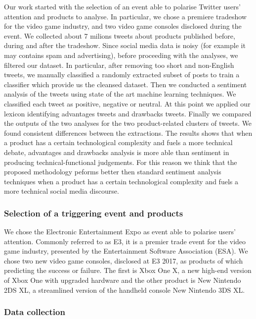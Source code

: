 \documentclass[]{book}
\begin{document}
Our work started with the selection of an event able to polarise Twitter
users' attention and products to analyse. In particular, we chose a
premiere tradeshow for the video game industry, and two video game
consoles disclosed during the event. We collected about 7 milions tweets
about products published before, during and after the tradeshow. Since
social media data is noisy (for example it may contains spam and
advertising), before proceeding with the analyses, we filtered our
dataset. In particular, after removing too short and non-English tweets,
we manually classified a randomly extracted subset of posts to train a
classifier which provide us the cleansed dataset. Then we conducted a
sentiment analysis of the tweets using state of the art machine learning
techniques. We classified each tweet as positive, negative or neutral.
At this point we applied our lexicon identifying advantages tweets and
drawbacks tweets. Finally we compared the outputs of the two analyses
for the two product-related clusters of tweets. We found consistent
differences between the extractions. The results shows that when a
product has a certain technological complexity and fuels a more
technical debate, advantages and drawbacks analysis is more able than
sentiment in producing technical-functional judgements. For this reason
we think that the proposed methodology peforms better then standard
sentiment analysis techniques when a product has a certain technological
complexity and fuels a more technical social media discourse.

\subsubsection*{Selection of a triggering event and
products}\label{selection-of-a-triggering-event-and-products}

We chose the Electronic Entertainment Expo as event able to polarise
users' attention. Commonly referred to as E3, it is a premier trade
event for the video game industry, presented by the Entertainment
Software Association (ESA). We chose two new video game consoles,
disclosed at E3 2017, as products of which predicting the success or
failure. The first is Xbox One X, a new high-end version of Xbox One
with upgraded hardware and the other product is New Nintendo 2DS XL, a
streamlined version of the handheld console New Nintendo 3DS XL.

\subsubsection*{Data collection}\label{data-collection}
\end{document}
